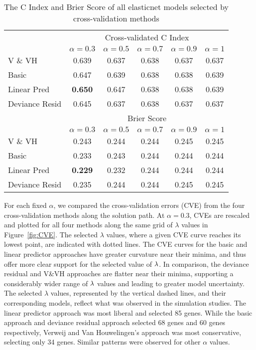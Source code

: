 \begin{table}[ht]
\centering
\caption{\label{tb:shedden} The C Index and Brier Score of all elasticnet models selected by cross-validation methods }
\begin{tabular}{lccccc}
\hline
  & \multicolumn{5}{c}{Cross-validated C Index} \\ 
  & $\alpha = 0.3$ & $\alpha = 0.5$ & $\alpha = 0.7$ & $\alpha = 0.9$ & $\alpha = 1$ \\ \cline{2-6}
V \& VH      & 0.639 & 0.637 & 0.638 & 0.637 & 0.637\\
Basic       & 0.647 & 0.639 & 0.638 & 0.638 & 0.639 \\
Linear Pred    & \textbf{0.650} & 0.647 & 0.638 & 0.638 & 0.639  \\
Deviance Resid & 0.645 & 0.637 & 0.638 & 0.637 & 0.637 \\ 
\addlinespace
  & \multicolumn{5}{c}{Brier Score} \\ 
  & $\alpha = 0.3$ & $\alpha = 0.5$ & $\alpha = 0.7$ & $\alpha = 0.9$ & $\alpha = 1$ \\ \cline{2-6}
V \& VH  & 0.243 & 0.244 & 0.244 & 0.245 & 0.245 \\
Basic  & 0.233 & 0.243 & 0.244 & 0.244 & 0.244 \\
Linear Pred & \textbf{0.229} & 0.232 & 0.244 & 0.244 & 0.244 \\
Deviance Resid & 0.235 & 0.244 & 0.244 & 0.245 & 0.245 \\ 
\hline
\end{tabular}
\end{table}

For each fixed $\alpha$, we compared the cross-validation errors (CVE) from the four cross-validation methods along the solution path. At $\alpha = 0.3$, CVEs are rescaled and plotted for all four methods along the same grid of $\lambda$ values in Figure~\ref{fig:CVE}. The selected $\lambda$ values, where a given CVE curve reaches its lowest point, are indicated with dotted lines.  The CVE curves for the basic and linear predictor approaches have greater curvature near their minima, and thus offer more clear support for the selected value of $\lambda$.  In comparison, the deviance residual and V\&VH approaches are flatter near their minima, supporting a considerably wider range of $\lambda$ values and leading to greater model uncertainty.   The selected $\lambda$ values, represented by the vertical dashed lines, and their corresponding models, reflect what was observed in the simulation studies. The linear predictor approach was most liberal and selected 85 genes. While the basic approach and deviance residual approach selected 68 genes and 60 genes respectively, Verweij and Van Houwelingen's approach was most conservative, selecting only 34 genes.  Similar patterns were observed for other $\alpha$ values.

